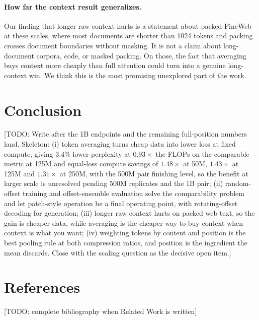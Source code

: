 \documentclass[11pt]{article}
\newcommand{\todo}[1]{\textcolor{warnred}{[TODO: #1]}}
\begin{document}
\paragraph{How far the context result generalizes.}
Our finding that longer raw context hurts is a statement about packed FineWeb at
these scales, where most documents are shorter than 1024 tokens and packing
crosses document boundaries without masking. It is not a claim about
long-document corpora, code, or masked packing. On those, the fact that
averaging buys context more cheaply than full attention could turn into a
genuine long-context win. We think this is the most promising unexplored part of
the work.

\section{Conclusion}
\label{sec:conclusion}

\todo{Write after the 1B endpoints and the remaining full-position numbers
land. Skeleton: (i) token averaging turns cheap data into lower loss at fixed
compute, giving $3.4\%$ lower perplexity at $0.93\times$ the FLOPs on the
comparable metric at 125M and equal-loss compute savings of $1.48\times$ at
50M, $1.43\times$ at 125M and $1.31\times$ at 250M, with the 500M pair
finishing level, so the benefit at larger scale is unresolved pending 500M
replicates and the 1B pair; (ii) random-offset
training and offset-ensemble evaluation solve the comparability problem and let
patch-style operation be a final operating point, with rotating-offset decoding
for generation; (iii) longer raw context hurts on packed web text, so the gain
is cheaper data, while averaging is the cheaper way to buy context when context
is what you want; (iv) weighting tokens by content and position is the best
pooling rule at both compression ratios, and position is the ingredient the mean
discards. Close with the scaling question as the decisive open item.}

\section*{References}
\todo{complete bibliography when Related Work is written}
\end{document}
